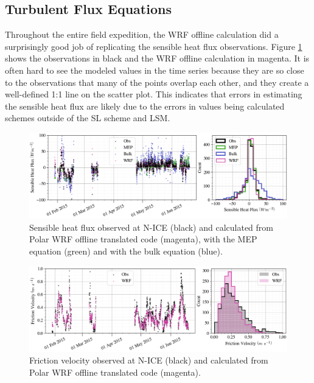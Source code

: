 \subsection{Turbulent Flux Equations}
Throughout the entire field expedition, the WRF offline calculation did a surprisingly good job of replicating the sensible heat flux observations. Figure \ref{fig:flux:sensible} shows the observations in black and the WRF offline calculation in magenta. It is often hard to see the modeled values in the time series because they are so close to the observations that many of the points overlap each other, and they create a well-defined 1:1 line on the scatter plot. This indicates that errors in estimating the sensible heat flux are likely due to the errors in values being calculated schemes outside of the SL scheme and LSM. 

\begin{figure}[t!]
    \centering
    \includegraphics[width=1\linewidth]{figures/chapter6/shf_wrf_histo.png}
    \caption[Sensible heat flux observed at N-ICE and calculated from Polar WRF offline translated code.]{Sensible heat flux observed at N-ICE (black) and calculated from Polar WRF offline translated code (magenta), with the MEP equation (green) and with the bulk equation (blue).}
    \label{fig:flux:sensible}
\end{figure}

\begin{figure}[b!]
    \centering
    \includegraphics[width=1\linewidth]{figures/chapter6/ustar_wrf.png}
    \caption[Friction velocity observed at N-ICE and calculated from Polar WRF offline translated code.]{Friction velocity observed at N-ICE (black) and calculated from Polar WRF offline translated code (magenta).}
    \label{fig:flux:ustar}
\end{figure}


